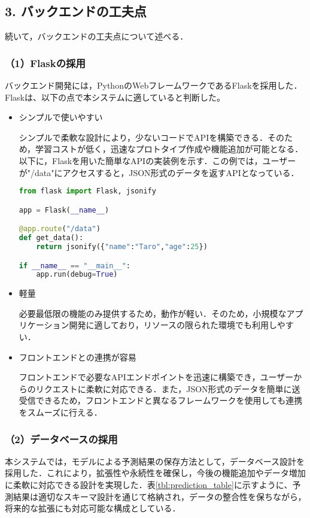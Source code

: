 \subsection*{3. バックエンドの工夫点}

続いて，バックエンドの工夫点について述べる．

\subsubsection*{（1）Flaskの採用}
バックエンド開発には，PythonのWebフレームワークであるFlaskを採用した．Flaskは、以下の点で本システムに適していると判断した。

\begin{itemize}
	\item シンプルで使いやすい
	
	シンプルで柔軟な設計により，少ないコードでAPIを構築できる．そのため，学習コストが低く，迅速なプロトタイプ作成や機能追加が可能となる．以下に，Flaskを用いた簡単なAPIの実装例を示す．この例では，ユーザーが"/data"にアクセスすると，JSON形式のデータを返すAPIとなっている．
\begin{lstlisting}[style=mystyle, language=Python, caption=Flaskによる簡単なAPIの実装例]
from flask import Flask, jsonify

app = Flask(__name__)

@app.route("/data")
def get_data():
	return jsonify({"name":"Taro","age":25})

if __name__ == "__main__":
	app.run(debug=True)
\end{lstlisting}
	
	\item 軽量
	
	必要最低限の機能のみ提供するため，動作が軽い．そのため，小規模なアプリケーション開発に適しており，リソースの限られた環境でも利用しやすい．

	\item フロントエンドとの連携が容易
	 
	フロントエンドで必要なAPIエンドポイントを迅速に構築でき，ユーザーからのリクエストに柔軟に対応できる．また，JSON形式のデータを簡単に送受信できるため，フロントエンドと異なるフレームワークを使用しても連携をスムーズに行える．
\end{itemize}

\subsubsection*{（2）データベースの採用}
本システムでは，モデルによる予測結果の保存方法として，データベース設計を採用した．これにより，拡張性や永続性を確保し，今後の機能追加やデータ増加に柔軟に対応できる設計を実現した．表\ref{tbl:prediction_table}に示すように、予測結果は適切なスキーマ設計を通じて格納され，データの整合性を保ちながら，将来的な拡張にも対応可能な構成としている．

